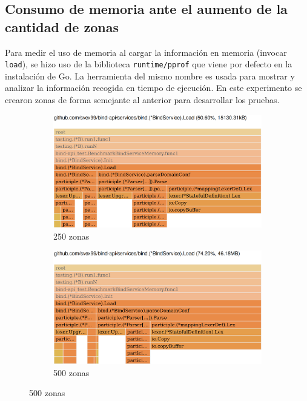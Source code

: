 \subsection{Consumo de memoria ante el aumento de la cantidad de zonas}

Para medir el uso de memoria al cargar la información en memoria (invocar \verb|load|), se hizo uso de la biblioteca \verb|runtime/pprof| que viene por defecto en la instalación de Go. La herramienta del mismo nombre es usada para mostrar y analizar la información recogida en tiempo de ejecución. En este experimento se crearon zonas de forma semejante al anterior para desarrollar los pruebas.

\begin{figure}
    \centering
    \begin{subfigure}{0.49\textwidth}
        \includegraphics[width=\textwidth]{Graphics/mem250z.png}
        \caption{250 zonas}
    \end{subfigure}
    \hfill
    \begin{subfigure}{0.49\textwidth}
        \includegraphics[width=\textwidth]{Graphics/mem500z.png}
        \caption{500 zonas}
    \end{subfigure}

\end{figure}
